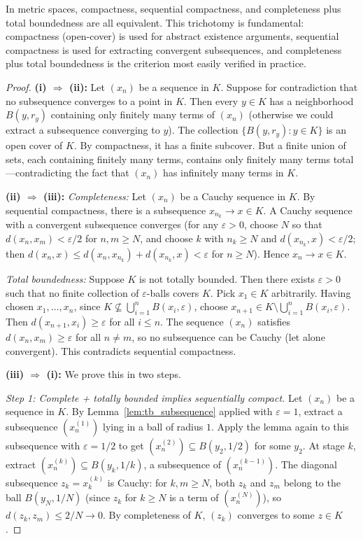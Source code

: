 \documentclass[11pt,a4paper]{article}
\begin{document}
\begin{keyresult}[title={Compactness Equivalence Theorem}]
In metric spaces, compactness, sequential compactness, and completeness plus
total boundedness are all equivalent. This trichotomy is fundamental:
compactness (open-cover) is used for abstract existence arguments, sequential
compactness is used for extracting convergent subsequences, and completeness
plus total boundedness is the criterion most easily verified in practice.
\end{keyresult}

\begin{proof}
\textbf{(i) $\Rightarrow$ (ii):}
Let $(x_n)$ be a sequence in $K$. Suppose for contradiction that no
subsequence converges to a point in $K$. Then every $y \in K$ has a
neighborhood $B(y, r_y)$ containing only finitely many terms of $(x_n)$
(otherwise we could extract a subsequence converging to $y$). The collection
$\{B(y, r_y) : y \in K\}$ is an open cover of $K$. By compactness, it has
a finite subcover. But a finite union of sets, each containing finitely many
terms, contains only finitely many terms total---contradicting the fact that
$(x_n)$ has infinitely many terms in $K$.

\textbf{(ii) $\Rightarrow$ (iii):}
\emph{Completeness:} Let $(x_n)$ be a Cauchy sequence in $K$. By sequential
compactness, there is a subsequence $x_{n_k} \to x \in K$. A Cauchy sequence
with a convergent subsequence converges (for any $\varepsilon > 0$, choose
$N$ so that $d(x_n, x_m) < \varepsilon/2$ for $n, m \ge N$, and choose
$k$ with $n_k \ge N$ and $d(x_{n_k}, x) < \varepsilon/2$; then
$d(x_n, x) \le d(x_n, x_{n_k}) + d(x_{n_k}, x) < \varepsilon$ for
$n \ge N$). Hence $x_n \to x \in K$.

\emph{Total boundedness:} Suppose $K$ is not totally bounded. Then there
exists $\varepsilon > 0$ such that no finite collection of
$\varepsilon$-balls covers $K$. Pick $x_1 \in K$ arbitrarily. Having chosen
$x_1, \ldots, x_n$, since $K \not\subseteq \bigcup_{i=1}^n B(x_i,
\varepsilon)$, choose $x_{n+1} \in K \setminus \bigcup_{i=1}^n
B(x_i, \varepsilon)$. Then $d(x_{n+1}, x_i) \ge \varepsilon$ for all
$i \le n$. The sequence $(x_n)$ satisfies $d(x_n, x_m) \ge \varepsilon$ for
all $n \ne m$, so no subsequence can be Cauchy (let alone convergent). This
contradicts sequential compactness.

\textbf{(iii) $\Rightarrow$ (i):}
We prove this in two steps.

\emph{Step 1: Complete + totally bounded implies sequentially compact.}
Let $(x_n)$ be a sequence in $K$. By Lemma~\ref{lem:tb_subsequence} applied
with $\varepsilon = 1$, extract a subsequence $(x_n^{(1)})$ lying in a ball
of radius $1$. Apply the lemma again to this subsequence with
$\varepsilon = 1/2$ to get $(x_n^{(2)}) \subseteq B(y_2, 1/2)$ for some
$y_2$. At stage $k$, extract $(x_n^{(k)}) \subseteq B(y_k, 1/k)$, a
subsequence of $(x_n^{(k-1)})$. The diagonal subsequence
$z_k = x_k^{(k)}$ is Cauchy: for $k, m \ge N$, both $z_k$ and $z_m$ belong
to the ball $B(y_N, 1/N)$ (since $z_k$ for $k \ge N$ is a term of
$(x_n^{(N)})$), so $d(z_k, z_m) \le 2/N \to 0$. By completeness of $K$,
$(z_k)$ converges to some $z \in K$.


\end{proof}
\end{document}
